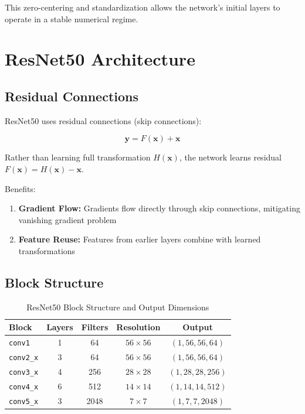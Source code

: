 \documentclass[12pt,a4paper,oneside]{book}
\begin{document}
This zero-centering and standardization allows the network's initial layers to operate in a stable numerical regime.

\section{ResNet50 Architecture}

\subsection{Residual Connections}

ResNet50 uses residual connections (skip connections):

\begin{equation}
\mathbf{y} = F(\mathbf{x}) + \mathbf{x}
\label{eq:residual}
\end{equation}

Rather than learning full transformation $H(\mathbf{x})$, the network learns residual $F(\mathbf{x}) = H(\mathbf{x}) - \mathbf{x}$.

Benefits:
\begin{enumerate}
  \item \textbf{Gradient Flow:} Gradients flow directly through skip connections, mitigating vanishing gradient problem
  \item \textbf{Feature Reuse:} Features from earlier layers combine with learned transformations
\end{enumerate}

\subsection{Block Structure}

\begin{table}[H]
\centering
\begin{tabular}{lcccc}
\toprule
\textbf{Block} & \textbf{Layers} & \textbf{Filters} & \textbf{Resolution} & \textbf{Output} \\
\midrule
\texttt{conv1} & 1 & 64 & $56 \times 56$ & $(1, 56, 56, 64)$ \\
\texttt{conv2\_x} & 3 & 64 & $56 \times 56$ & $(1, 56, 56, 64)$ \\
\texttt{conv3\_x} & 4 & 256 & $28 \times 28$ & $(1, 28, 28, 256)$ \\
\texttt{conv4\_x} & 6 & 512 & $14 \times 14$ & $(1, 14, 14, 512)$ \\
\texttt{conv5\_x} & 3 & 2048 & $7 \times 7$ & $(1, 7, 7, 2048)$ \\
\bottomrule
\end{tabular}
\caption{ResNet50 Block Structure and Output Dimensions}
\label{tab:resnet_blocks}
\end{table}
\end{document}
